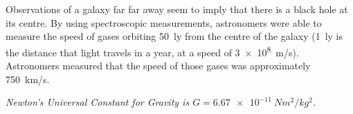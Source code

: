 \question Observations of a galaxy far far away seem to imply that there is a black hole at its centre. By using spectroscopic measurements, astronomers were able to measure the speed of gases orbiting \SI{50}{ly} from the centre of the galaxy (\SI{1}{ly} is the distance that light travels in a year, at a speed of \SI{3e8}{m/s}). Astronomers measured that the speed of those gases was approximately \SI{750}{km/s}.

\textit{Newton's Universal Constant for Gravity is $G=\SI{6.67e-11}{Nm^2/kg^2}$.}


